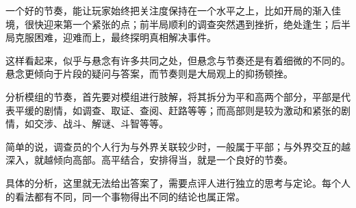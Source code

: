 \documentclass[a4paper,zihao=-4,notitlepage,twoside,openright]{ctexart}
\begin{document}
一个好的节奏，能让玩家始终把关注度保持在一个水平之上，比如开局的渐入佳境，很快迎来第一个紧张的点；前半局顺利的调查突然遇到挫折，绝处逢生；后半局克服困难，迎难而上，最终探明真相解决事件。

这样看起来，似乎与悬念有许多共同之处，但悬念与节奏还是有着细微的不同的。悬念更倾向于片段的疑问与答案，而节奏则是大局观上的抑扬顿挫。

分析模组的节奏，首先要对模组进行肢解，将其拆分为平和高两个部分，平部是代表平缓的剧情，如调查、取证、查阅、赶路等等；而高部则是较为激动和紧张的剧情，如交涉、战斗、解谜、斗智等等。

简单的说，调查员的个人行为与外界关联较少时，一般属于平部；与外界交互的越深入，就越倾向高部。高平结合，安排得当，就是一个良好的节奏。

具体的分析，这里就无法给出答案了，需要点评人进行独立的思考与定论。每个人的看法都有不同，同一个事物得出不同的结论也属正常。
\end{document}
